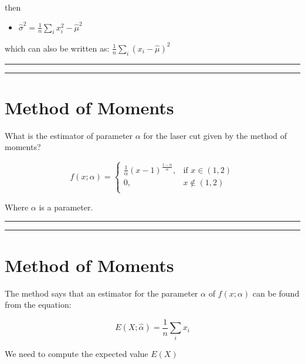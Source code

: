 \documentclass[
]{book}
\providecommand{\tightlist}{%
  \setlength{\itemsep}{0pt}\setlength{\parskip}{0pt}}
\begin{document}
then

\begin{itemize}
\tightlist
\item
  \(\hat{\sigma}^2= \frac{1}{n} \sum_i x^2_i -\hat{\mu}^2\)
\end{itemize}

which can also be written as:
\(\frac{1}{n} \sum_i(x_i-\hat{\mu})^2\)

\begin{center}\rule{0.5\linewidth}{0.5pt}\end{center}

\begin{center}\rule{0.5\linewidth}{0.5pt}\end{center}

\hypertarget{method-of-moments-7}{%
\section{Method of Moments}\label{method-of-moments-7}}

What is the estimator of parameter \(\alpha\) for the laser cut given by the method of moments?

\[
    f(x; \alpha)= 
\begin{cases}
\frac{1}{\alpha}(x-1)^{\frac{1-\alpha}{\alpha}},& \text{if } x \in (1,2)\\
    0,& x \notin (1,2)\\
\end{cases}
\]

Where \(\alpha\) is a parameter.

\begin{center}\rule{0.5\linewidth}{0.5pt}\end{center}

\begin{center}\rule{0.5\linewidth}{0.5pt}\end{center}

\hypertarget{method-of-moments-8}{%
\section{Method of Moments}\label{method-of-moments-8}}

The method says that an estimator for the parameter \(\alpha\) of \(f(x;\alpha)\) can be found from the equation:

\[E(X; \hat{\alpha})=\frac{1}{n}\sum_i x_i\]

We need to compute the expected value \(E(X)\)
\end{document}
